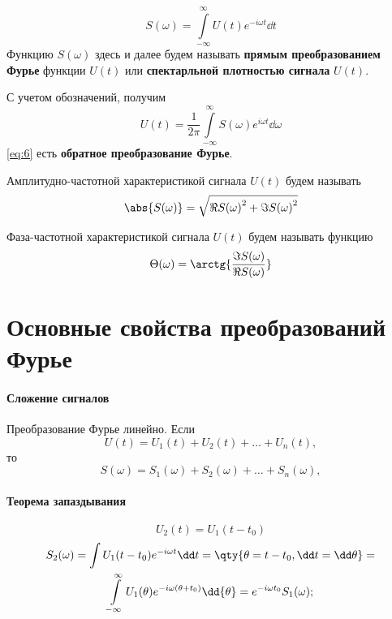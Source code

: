 \documentclass[a4paper,14pt]{extarticle}
\begin{document}
\begin{equation}
    \boxed{
    S(\omega) = \int\limits_{-\infty}^{\infty} U(t) e^{-i\omega t} \dd{t} 
}
\end{equation}
Функцию $S(\omega)$ здесь и далее будем называть 
\textbf{прямым преобразованием Фурье} функции $U(t)$ или 
\textbf{спектарльной плотностью сигнала} $U(t)$.

С учетом обозначений, получим
\begin{equation}
    \label{eq:6}
    \boxed{
    U(t) = \frac{1}{2 \pi} \int\limits_{-\infty}^{\infty} 
            S(\omega) e^{i \omega t} \dd \omega }
\end{equation}
\eqref{eq:6} есть \textbf{обратное преобразование Фурье}.

Амплитудно-частотной характеристикой сигнала $U(t)$ будем называть 
\begin{equation}
    \abs{S(\omega)} = \sqrt{ \Re{S(\omega)}^2 + \Im{S(\omega)}^2} 
\end{equation} 

Фаза-частотной характеристикой сигнала $U(t)$ будем называть функцию
\begin{equation}
    \label{eq:}
    \Theta(\omega) = \arctg{\frac{\Im{S(\omega)}}{\Re{S(\omega)}}}
\end{equation}

\section{Основные свойства преобразований Фурье}%
\paragraph{Сложение сигналов}%
Преобразование Фурье линейно.
Если 
\begin{equation}
    \label{eq:}
    U(t) = U_{1}(t) + U_{2}(t) + \dots + U_n(t),
\end{equation}
то 
\begin{equation}
    \label{eq:}
    S(\omega) = S_{1}(\omega) + S_{2}(\omega) + \dots + S_n (\omega),
\end{equation}


\paragraph{Теорема запаздывания}%
\begin{equation}
    \label{eq:}
    U_{2}(t) = U_{1}(t-t_{0})
\end{equation}
\begin{gather}
    \label{eq:}
    S_{2}(\omega) = \int U_1(t - t_{0}) e^{- i \omega t} \dd t =
    \qty{\theta = t -t_{0}, \dd t = \dd \theta} = \\ 
    \int\limits_{-\infty}^{\infty} 
    U_1 (\theta) e^{- i \omega(\theta+t_{0})} \dd{\theta}  = e^{-i\omega t_{0}}
    S_{1}(\omega);
\end{gather}
\end{document}
